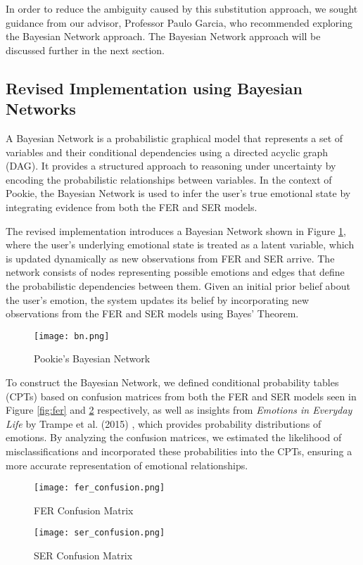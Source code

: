 In order to reduce the ambiguity caused by this substitution approach, we sought guidance from our advisor, Professor Paulo Garcia, who recommended exploring the Bayesian Network approach. The Bayesian Network approach will be discussed further in the next section.

\subsection{Revised Implementation using Bayesian Networks}

A Bayesian Network is a probabilistic graphical model that represents a set of variables and their conditional dependencies using a directed acyclic graph (DAG). It provides a structured approach to reasoning under uncertainty by encoding the probabilistic relationships between variables. In the context of Pookie, the Bayesian Network is used to infer the user's true emotional state by integrating evidence from both the FER and SER models.

The revised implementation introduces a Bayesian Network shown in Figure \ref{fig:bn}, where the user's underlying emotional state is treated as a latent variable, which is updated dynamically as new observations from FER and SER arrive. The network consists of nodes representing possible emotions and edges that define the probabilistic dependencies between them. Given an initial prior belief about the user's emotion, the system updates its belief by incorporating new observations from the FER and SER models using Bayes’ Theorem.

\begin{figure}[ht]
    \centering
    \texttt{[image: bn.png]}
    \caption{Pookie's Bayesian Network}
    \label{fig:bn}
\end{figure}

\newpage
To construct the Bayesian Network, we defined conditional probability tables (CPTs) based on confusion matrices from both the FER and SER models seen in Figure \ref{fig:fer} and \ref{fig:ser} respectively, as well as insights from \textit{Emotions in Everyday Life} by Trampe et al. (2015) \cite{10.1371/journal.pone.0145450}, which provides probability distributions of emotions. By analyzing the confusion matrices, we estimated the likelihood of misclassifications and incorporated these probabilities into the CPTs, ensuring a more accurate representation of emotional relationships.

\begin{figure} [!ht]
    \centering
    \begin{minipage}{0.45\textwidth}
        \centering
        \texttt{[image: fer\_confusion.png]}
        \caption{FER Confusion Matrix}
        \label{fig:fer}
    \end{minipage}
    \hfill
    \begin{minipage}{0.45\textwidth}
        \centering
        \texttt{[image: ser\_confusion.png]}
        \caption{SER Confusion Matrix}
        \label{fig:ser}
    \end{minipage}
\end{figure}

